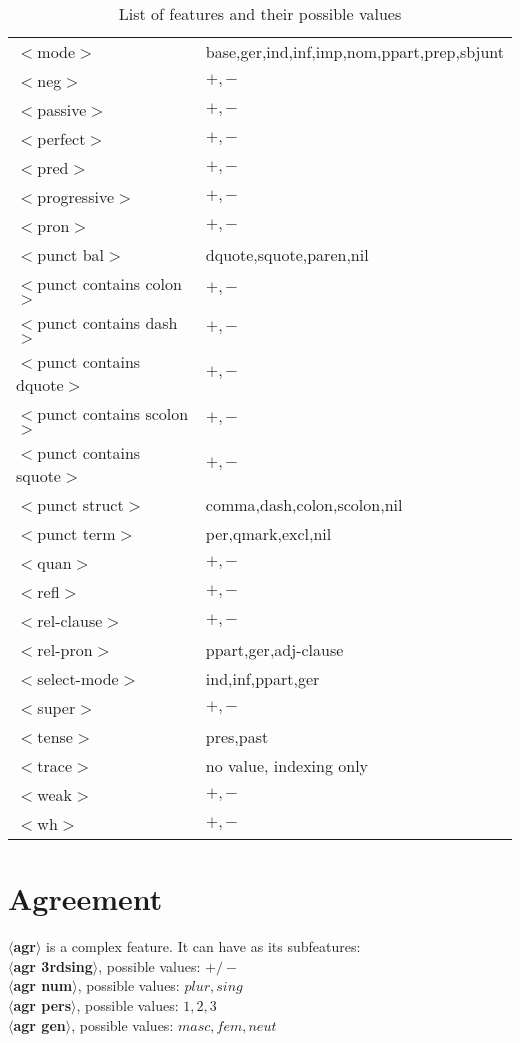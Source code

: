 \begin{table}[htbp]
\begin{tabular}{|l|l|}
$<$mode$>$&base,ger,ind,inf,imp,nom,ppart,prep,sbjunt\\
$<$neg$>$&$+,-$\\
$<$passive$>$&$+,-$\\
$<$perfect$>$&$+,-$\\
$<$pred$>$&$+,-$\\
$<$progressive$>$&$+,-$\\
$<$pron$>$&$+,-$\\
$<$punct bal$>$&dquote,squote,paren,nil\\
$<$punct contains colon$>$&$+,-$\\
$<$punct contains dash$>$&$+,-$\\
$<$punct contains dquote$>$&$+,-$\\
$<$punct contains scolon$>$&$+,-$\\
$<$punct contains squote$>$&$+,-$\\
$<$punct struct$>$&comma,dash,colon,scolon,nil\\
$<$punct term$>$&per,qmark,excl,nil\\
$<$quan$>$&$+,-$\\
$<$refl$>$&$+,-$\\
$<$rel-clause$>$&$+,-$\\
$<$rel-pron$>$&ppart,ger,adj-clause\\
$<$select-mode$>$&ind,inf,ppart,ger\\
$<$super$>$&$+,-$\\
$<$tense$>$&pres,past\\
$<$trace$>$&no value, indexing only\\
$<$weak$>$&$+,-$\\
$<$wh$>$&$+,-$\\
\hline
\end{tabular}
\caption{List of features and their possible values}
\label{feature-table}
\end{table}

\normalsize


\section{Agreement}
{\bf $\langle$agr$\rangle$} is a complex feature.
It can have as its subfeatures:\\
{\bf $\langle$agr 3rdsing$\rangle$}, possible values: {\bf $+/-$ }\\
{\bf $\langle$agr num$\rangle$}, possible values: {\bf $plur,sing$ }\\
{\bf $\langle$agr pers$\rangle$}, possible values: {\bf $1,2,3$ }\\
{\bf $\langle$agr gen$\rangle$}, possible values: {\bf $masc,fem,neut$ }

